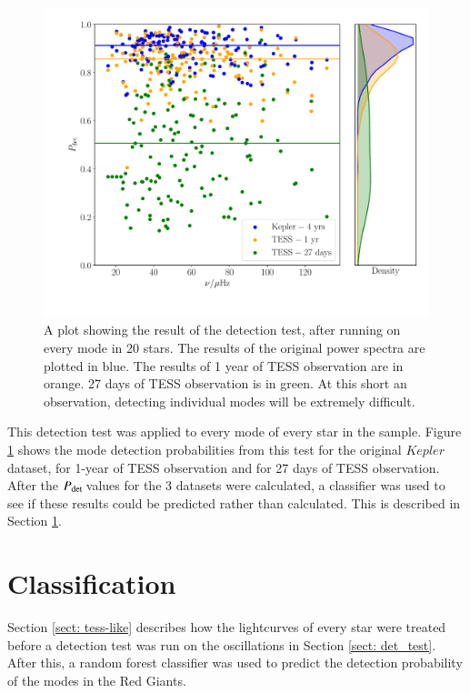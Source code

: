\documentclass[a4paper,fleqn,usenatbib,useAMS]{mnras}
\newcommand{\kep}{\ensuremath{Kepler}\:}
\newcommand{\pdet}{\ensuremath{P_{\rm det}\:}}
\begin{document}
\begin{figure}
	\centering
	\includegraphics[scale=0.35]{DetTest_Diagnostic_plot3.pdf}
	\caption{A plot showing the result of the detection test, after running on every mode in 20 stars. The results of the original power spectra are plotted in blue. The results of 1 year of TESS observation are in orange. 27 days of TESS observation is in green. At this short an observation, detecting individual modes will be extremely difficult.}	
	\label{fig: modes}
\end{figure}

This detection test was applied to every mode of every star in the sample. Figure \ref{fig: modes} shows the mode detection probabilities from this test for the original \kep dataset, for 1-year of TESS observation and for 27 days of TESS observation. After the \pdet values for the 3 datasets were calculated, a classifier was used to see if these results could be predicted rather than calculated. This is described in Section \ref{sect: classifier}.


\section{Classification}
\label{sect: classifier}

Section \ref{sect: tess-like} describes how the lightcurves of every star were treated before a detection test was run on the oscillations in Section \ref{sect: det_test}. After this, a random forest classifier was used to predict the detection probability of the modes in the Red Giants. 
\end{document}
